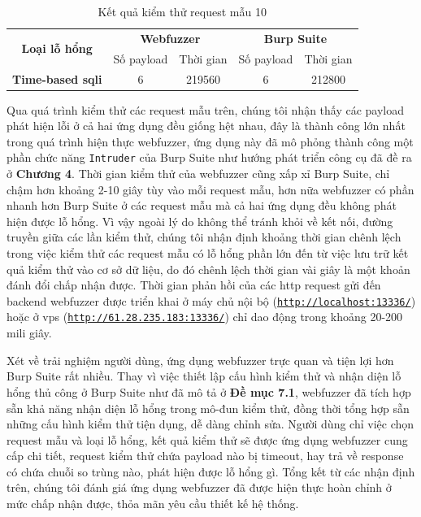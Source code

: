 \FloatBarrier
\begin{table}[ht]
    \centering
    \caption{Kết quả kiểm thử request mẫu 10}
    \label{tab:testing-result-10}
    \begin{tabular}[ht]{ccccc}
        \toprule[1pt]\midrule[0.3pt]
            \multirow{2}{*}{\textbf{Loại lỗ hổng}}&\multicolumn{2}{c}{\textbf{Webfuzzer}}&\multicolumn{2}{c}{\textbf{Burp Suite}}\\
            \cmidrule(lr){2-3}\cmidrule(lr){4-5}{}&Số payload&Thời gian&Số payload&Thời gian\\
        \midrule[0.3pt]
            \textbf{Time-based \acrshort{sqli}}&6&219560&6&212800\\
        \midrule[0.3pt]\bottomrule[1pt]
    \end{tabular}
\end{table}
\FloatBarrier
Qua quá trình kiểm thử các request mẫu trên, chúng tôi nhận thấy các payload phát hiện lỗi ở cả hai ứng dụng đều giống hệt nhau, đây là thành công lớn nhất trong quá trình hiện thực webfuzzer, ứng dụng này đã mô phỏng thành công một phần chức năng \texttt{Intruder} của Burp Suite như hướng phát triển công cụ đã đề ra ở \textbf{Chương 4}. Thời gian kiểm thử của webfuzzer cũng xấp xỉ Burp Suite, chỉ chậm hơn khoảng 2-10 giây tùy vào mỗi request mẫu, hơn nữa webfuzzer có phần nhanh hơn Burp Suite ở các request mẫu mà cả hai ứng dụng đều không phát hiện được lỗ hổng. Vì vậy ngoài lý do không thể tránh khỏi về kết nối, đường truyền giữa các lần kiểm thử, chúng tôi nhận định khoảng thời gian chênh lệch trong việc kiểm thử các request mẫu có lỗ hổng phần lớn đến từ việc lưu trữ kết quả kiểm thử vào cơ sở dữ liệu, do đó chênh lệch thời gian vài giây là một khoản đánh đổi chấp nhận được. Thời gian phản hồi của các \acrshort{http} request gửi đến backend webfuzzer được triển khai ở máy chủ nội bộ (\href{http://localhost:13336/}{\texttt{http://localhost:13336/}}) hoặc ở \acrshort{vps} (\href{http://61.28.235.183:13336/}{\texttt{http://61.28.235.183:13336/}}) chỉ dao động trong khoảng 20-200 mili giây.\par
Xét về trải nghiệm người dùng, ứng dụng webfuzzer trực quan và tiện lợi hơn Burp Suite rất nhiều. Thay vì việc thiết lập cấu hình kiểm thử và nhận diện lỗ hổng thủ công ở Burp Suite như đã mô tả ở \textbf{Đề mục 7.1}, webfuzzer đã tích hợp sẵn khả năng nhận diện lỗ hổng trong mô-đun kiểm thử, đồng thời tổng hợp sẵn những cấu hình kiểm thử tiện dụng, dễ dàng chỉnh sửa. Người dùng chỉ việc chọn request mẫu và loại lỗ hổng, kết quả kiểm thử sẽ được ứng dụng webfuzzer cung cấp chi tiết, request kiểm thử chứa payload nào bị timeout, hay trả về response có chứa chuỗi so trùng nào, phát hiện được lỗ hổng gì. Tổng kết từ các nhận định trên, chúng tôi đánh giá ứng dụng webfuzzer đã được hiện thực hoàn chỉnh ở mức chấp nhận được, thỏa mãn yêu cầu thiết kế hệ thống.